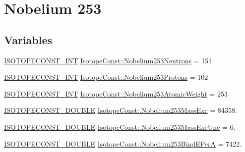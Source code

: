\hypertarget{group___isotope_const-_nobelium-_no253}{}\section{Nobelium 253}
\label{group___isotope_const-_nobelium-_no253}
\subsection*{Variables}
\begin{DoxyCompactItemize}
\item 
\mbox{\hyperlink{group___isotope_const-_macros_ga5f18360b3e99483a35c32d789e62621c}{I\+S\+O\+T\+O\+P\+E\+C\+O\+N\+S\+T\+\_\+\+I\+NT}} \mbox{\hyperlink{group___isotope_const-_nobelium-_no253_gaad94cef0e5f259b9ffb87837c8634e96}{Isotope\+Const\+::\+Nobelium253\+Neutrons}} = 151
\item 
\mbox{\hyperlink{group___isotope_const-_macros_ga5f18360b3e99483a35c32d789e62621c}{I\+S\+O\+T\+O\+P\+E\+C\+O\+N\+S\+T\+\_\+\+I\+NT}} \mbox{\hyperlink{group___isotope_const-_nobelium-_no253_ga9f229c723618e3e06f639960a1375d59}{Isotope\+Const\+::\+Nobelium253\+Protons}} = 102
\item 
\mbox{\hyperlink{group___isotope_const-_macros_ga5f18360b3e99483a35c32d789e62621c}{I\+S\+O\+T\+O\+P\+E\+C\+O\+N\+S\+T\+\_\+\+I\+NT}} \mbox{\hyperlink{group___isotope_const-_nobelium-_no253_ga45ec1ba3f48d7869341c35dac41bc774}{Isotope\+Const\+::\+Nobelium253\+Atomic\+Weight}} = 253
\item 
\mbox{\hyperlink{group___isotope_const-_macros_ga8f45a7272ce02c0b4c65c44636ed719a}{I\+S\+O\+T\+O\+P\+E\+C\+O\+N\+S\+T\+\_\+\+D\+O\+U\+B\+LE}} \mbox{\hyperlink{group___isotope_const-_nobelium-_no253_gaf6b1bfb31a91c75ddfeb39b2dc676919}{Isotope\+Const\+::\+Nobelium253\+Mass\+Exc}} = 84358.
\item 
\mbox{\hyperlink{group___isotope_const-_macros_ga8f45a7272ce02c0b4c65c44636ed719a}{I\+S\+O\+T\+O\+P\+E\+C\+O\+N\+S\+T\+\_\+\+D\+O\+U\+B\+LE}} \mbox{\hyperlink{group___isotope_const-_nobelium-_no253_ga5f6e6112aa46842f827844be231c1cf3}{Isotope\+Const\+::\+Nobelium253\+Mass\+Exc\+Unc}} = 6.
\item 
\mbox{\hyperlink{group___isotope_const-_macros_ga8f45a7272ce02c0b4c65c44636ed719a}{I\+S\+O\+T\+O\+P\+E\+C\+O\+N\+S\+T\+\_\+\+D\+O\+U\+B\+LE}} \mbox{\hyperlink{group___isotope_const-_nobelium-_no253_gaf6eb8d0d98b28d096dccf8d4b14dda95}{Isotope\+Const\+::\+Nobelium253\+Bind\+E\+PerA}} = 7422.
\item 

\end{DoxyCompactItemize}
